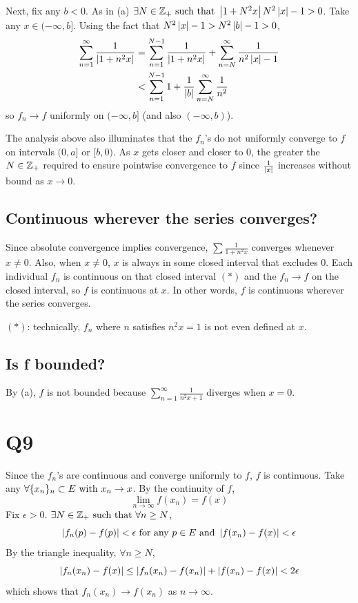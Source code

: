 \documentclass[12pt]{article}
\begin{document}
Next, fix any $b < 0$. 
As in (a) $\exists N \in \mathbb{Z}_{+} \text{ such that } \left|1 + N^2 x\right| N^2 \left|x\right| - 1 > 0$. 
Take any $x \in (-\infty, b]$. 
Using the fact that $N^2 \left|x\right| - 1 > N^2 \left|b\right| - 1 > 0$, 
\begin{align*} 
  \sum_{n = 1}^{\infty} \frac{1}{\left|1 + n^2 x\right|} & = \sum_{n = 1}^{N - 1} \frac{1}{\left|1 + n^2 x\right|} + \sum_{n = N}^{\infty} \frac{1}{n^2 \left|x\right| - 1} \\ 
                                                  & < \sum_{n = 1}^{N - 1} 1 + \frac{1}{\left|b\right|} \sum_{n = N}^{\infty} \frac{1}{n^2} 
\end{align*}
so $f_n \rightarrow f$ uniformly on $(-\infty, b]$ (and also $(-\infty, b)$). 

The analysis above also illuminates that the $f_n$'s do not uniformly converge to $f$ on intervals $(0, a]$ or $[b, 0)$. 
As $x$ gets closer and closer to $0$, the greater the $N \in \mathbb{Z}_{+}$ required to ensure pointwise convergence to $f$ since $\frac{1}{\left|x\right|}$ increases without bound as $x \rightarrow 0$.  

\subsection{Continuous wherever the series converges?}
Since absolute convergence implies convergence, $\sum \frac{1}{1 + n^2 x}$ converges whenever $x \neq 0$. 
Also, when $x \neq 0$, $x$ is always in some closed interval that excludes 0. 
Each individual $f_n$ is continuous on that closed interval $(*)$ and the $f_n \rightarrow f$ on the closed interval, so $f$ is continuous at $x$.
In other words, $f$ is continuous wherever the series converges. 

$(*)$: technically, $f_n$ where $n$ satisfies $n^2 x = 1$ is not even defined at $x$.  

\subsection{Is f bounded?} 
By (a), $f$ is not bounded because $\sum_{n = 1}^{\infty} \frac{1}{n^2 x + 1}$ diverges when $x = 0$.


\section*{Q9} %
Since the $f_n$'s are continuous and converge uniformly to $f$, $f$ is continuous. 
Take any $\forall \{x_n\}_n \subset E \text{ with } x_n \rightarrow x$.
By the continuity of $f$, 
$$\lim_{n \rightarrow \infty} f(x_n) = f(x)$$
Fix $\epsilon > 0$. 
$\exists N \in \mathbb{Z}_{+} \text{ such that } \forall n \geq N$, 
$$\left|f_n(p) - f(p)\right| < \epsilon \text{ for any } p \in E \text{ and } \left|f(x_n) - f(x)\right| < \epsilon$$
By the triangle inequality, $\forall n \geq N$,  
$$\left|f_n(x_n) - f(x)\right| \leq \left|f_n(x_n) - f(x_n)\right| + \left|f(x_n) - f(x)\right| < 2\epsilon$$ 
which shows that $f_n(x_n) \rightarrow f(x_n)$ as $n \rightarrow \infty$. 
\end{document}

